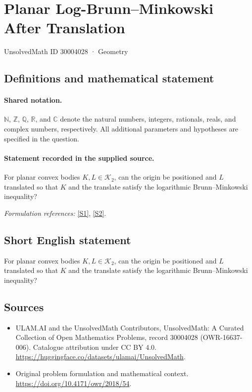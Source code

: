 \documentclass[11pt]{article}
\newcommand{\sref}[2]{\hyperlink{source:#1:#2}{[S#2]}}
\begin{document}
\setcounter{section}{30004027}
\section{Planar Log-Brunn–Minkowski After Translation}\label{30004028}
{\small UnsolvedMath ID 30004028 · Geometry}
\subsection{Definitions and mathematical statement}

\paragraph{Shared notation.}$\mathbb N$, $\mathbb Z$, $\mathbb Q$, $\mathbb R$, and $\mathbb C$ denote the natural numbers, integers, rationals, reals, and complex numbers, respectively. All additional parameters and hypotheses are specified in the question.


\paragraph{Statement recorded in the supplied source.}
For planar convex bodies $K,L\in\mathcal K_2$, can the origin be positioned and $L$ translated so that $K$ and the translate satisfy the logarithmic Brunn–Minkowski inequality?
\par\smallskip\textit{Formulation references:} \sref{30004028}{1}, \sref{30004028}{2}.
\subsection{Short English statement}
For planar convex bodies $K,L\in\mathcal K_2$, can the origin be positioned and $L$ translated so that $K$ and the translate satisfy the logarithmic Brunn–Minkowski inequality?
\subsection{Sources}
\begin{itemize}
\item[\hypertarget{source:30004028:1}{S1}] ULAM.AI and the UnsolvedMath Contributors, UnsolvedMath: A Curated Collection of Open Mathematics Problems, record 30004028 (OWR-16637-006). Catalogue attribution under CC BY 4.0.
\url{https://huggingface.co/datasets/ulamai/UnsolvedMath}.
\item[\hypertarget{source:30004028:2}{S2}] Original problem formulation and mathematical context.
\url{https://doi.org/10.4171/owr/2018/54}.
\end{itemize}
\label{end:30004028}
\end{document}
